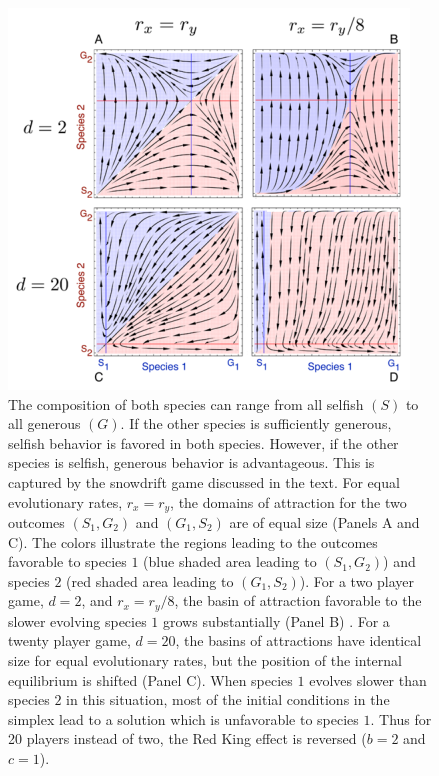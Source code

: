 \documentclass[a4paper]{scrartcl}
\begin{document}
\begin{figure}
\begin{center}
\includegraphics[width=\linewidth]{compare.eps}
\end{center}
\caption{
The composition of both species can range from all selfish $(S)$ to all generous $(G)$. 
If the other species is sufficiently generous, selfish behavior is favored in both species.
However, if the other species is selfish, generous behavior is advantageous.  
This is captured by the snowdrift game discussed in the text.
For equal evolutionary rates, $r_x=r_y$, the domains of attraction for the two outcomes $(S_1, G_2)$ and $(G_1, S_2)$
are of equal size (Panels A and C).
The colors illustrate the regions leading to the outcomes favorable to species $1$ (blue shaded area leading to $(S_1, G_2)$) 
and species $2$ (red shaded area leading to $(G_1, S_2)$).
For a two player game, $d=2$, and $r_x=r_y/8$, the basin of attraction favorable to the slower evolving species $1$ grows substantially (Panel B) \citep{bergstrom:2003jf}.
For a twenty player game, $d=20$, the basins of attractions have identical size for equal evolutionary rates, but the position of the internal equilibrium is shifted (Panel C).
When species $1$ evolves slower than species $2$ in this situation, most of the initial conditions in the simplex lead to a solution which is unfavorable to species $1$.
Thus for 20 players instead of two, the Red King effect is reversed ($b=2$ and $c=1$).
\label{fig:compare}
}
\end{figure}
\end{document}
